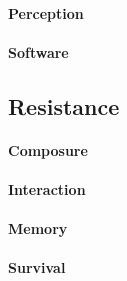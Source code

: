 \paragraph{Perception}

\paragraph{Software}


\subsection{Resistance}

\paragraph{Composure}

\paragraph{Interaction}

\paragraph{Memory}

\paragraph{Survival}



